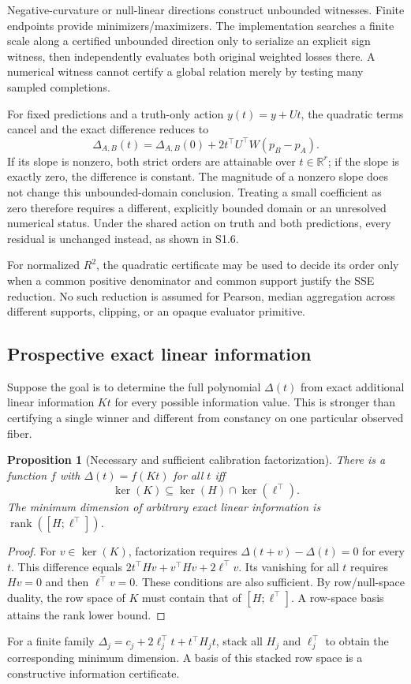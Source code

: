 \documentclass[11pt]{article}
\newtheorem{proposition}{Proposition}
\DeclareMathOperator{\rank}{rank}\DeclareMathOperator{\kerop}{ker}
\begin{document}
Negative-curvature or null-linear directions construct unbounded witnesses. Finite endpoints provide minimizers/maximizers. The implementation searches a finite scale along a certified unbounded direction only to serialize an explicit sign witness, then independently evaluates both original weighted losses there. A numerical witness cannot certify a global relation merely by testing many sampled completions.

For fixed predictions and a truth-only action $y(t)=y+Ut$, the quadratic terms cancel and the exact difference reduces to
\[
\Delta_{A,B}(t)=\Delta_{A,B}(0)+2t^\top U^\top W(p_B-p_A).
\]
If its slope is nonzero, both strict orders are attainable over $t\in\mathbb R^r$; if the slope is exactly zero, the difference is constant. The magnitude of a nonzero slope does not change this unbounded-domain conclusion. Treating a small coefficient as zero therefore requires a different, explicitly bounded domain or an unresolved numerical status. Under the shared action on truth and both predictions, every residual is unchanged instead, as shown in S1.6.

For normalized $R^2$, the quadratic certificate may be used to decide its order only when a common positive denominator and common support justify the SSE reduction. No such reduction is assumed for Pearson, median aggregation across different supports, clipping, or an opaque evaluator primitive.


\subsection{Prospective exact linear information}
Suppose the goal is to determine the full polynomial $\Delta(t)$ from exact additional linear information $Kt$ for every possible information value. This is stronger than certifying a single winner and different from constancy on one particular observed fiber.

\begin{proposition}[Necessary and sufficient calibration factorization]
There is a function $f$ with $\Delta(t)=f(Kt)$ for all $t$ iff
\[
\ker(K)\subseteq\ker(H)\cap\ker(\ell^\top).
\]
The minimum dimension of arbitrary exact linear information is $\rank([H;\ell^\top])$.
\end{proposition}
\begin{proof}
For $v\in\ker(K)$, factorization requires $\Delta(t+v)-\Delta(t)=0$ for every $t$. This difference equals $2t^\top Hv+v^\top Hv+2\ell^\top v$. Its vanishing for all $t$ requires $Hv=0$ and then $\ell^\top v=0$. These conditions are also sufficient. By row/null-space duality, the row space of $K$ must contain that of $[H;\ell^\top]$. A row-space basis attains the rank lower bound.
\end{proof}
For a finite family $\Delta_j=c_j+2\ell_j^\top t+t^\top H_jt$, stack all $H_j$ and $\ell_j^\top$ to obtain the corresponding minimum dimension. A basis of this stacked row space is a constructive information certificate.
\end{document}
